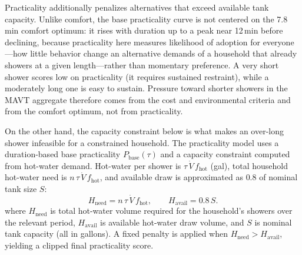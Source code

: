 \documentclass[final,3p,times]{elsarticle}
\begin{document}
Practicality additionally penalizes alternatives that exceed available tank capacity. Unlike comfort, the base practicality curve is not centered on the 7.8\,min comfort optimum: it rises with duration up to a peak near 12\,min before declining, because practicality here measures likelihood of adoption for everyone---how little behavior change an alternative demands of a household that already showers at a given length---rather than momentary preference. A very short shower scores low on practicality (it requires sustained restraint), while a moderately long one is easy to sustain. Pressure toward shorter showers in the MAVT aggregate therefore comes from the cost and environmental criteria and from the comfort optimum, not from practicality.

On the other hand, the capacity constraint below is what makes an over-long shower infeasible for a constrained household.
The practicality model uses a duration-based base practicality $P_{\mathrm{base}}(\tau)$ and a capacity constraint computed from hot-water demand. Hot-water per shower is $\tau\,\dot V\,f_{\mathrm{hot}}$ (gal), total household hot-water need is $n\,\tau\,\dot V\,f_{\mathrm{hot}}$, and available draw is approximated as $0.8$ of nominal tank size $S$:
\begin{equation}
  H_{\mathrm{need}} = n\,\tau\,\dot V\,f_{\mathrm{hot}}, \qquad
  H_{\mathrm{avail}} = 0.8\,S.
  \label{eq:shower_capacity_need_avail}
\end{equation}
\noindent where $H_{\mathrm{need}}$ is total hot-water volume required for the household's showers over the relevant period, $H_{\mathrm{avail}}$ is available hot-water draw volume, and $S$ is nominal tank capacity (all in gallons).
A fixed penalty is applied when $H_{\mathrm{need}}>H_{\mathrm{avail}}$, yielding a clipped final practicality score.
\end{document}
